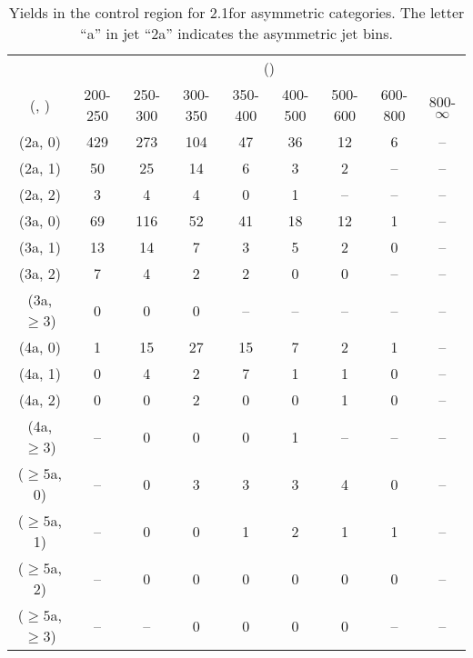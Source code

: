 \begin{table}[h!]
\tiny
\centering
\caption{Yields in the \mmj control region for 2.1\ifb for asymmetric categories. The letter ``a'' in jet \eg ``2a''  indicates the asymmetric jet bins.\label{tab:yieldssep_mumu_data_asym}}
\begin{tabular}
{ccccccccc}
	\hline\hline
	& \multicolumn{8}{c}{\scalht (\gev)} \\ 
	 (\njet,  \nb) & 200-250 & 250-300 & 300-350 & 350-400 & 400-500 & 500-600 & 600-800 & 800-$\infty$ \\ [0.8ex] 
\hline
	(2a, 0) & 429 & 273 & 104 & 47 & 36 & 12 & 6 & -- \\[0.5ex] 
	(2a, 1) & 50 & 25 & 14 & 6 & 3 & 2 & -- & -- \\[0.5ex] 
	(2a, 2) & 3 & 4 & 4 & 0 & 1 & -- & -- & -- \\[0.5ex] 
	(3a, 0) & 69 & 116 & 52 & 41 & 18 & 12 & 1 & -- \\[0.5ex] 
	(3a, 1) & 13 & 14 & 7 & 3 & 5 & 2 & 0 & -- \\[0.5ex] 
	(3a, 2) & 7 & 4 & 2 & 2 & 0 & 0 & -- & -- \\[0.5ex] 
	(3a, $\ge3$) & 0 & 0 & 0 & -- & -- & -- & -- & -- \\[0.5ex] 
	(4a, 0) & 1 & 15 & 27 & 15 & 7 & 2 & 1 & -- \\[0.5ex] 
	(4a, 1) & 0 & 4 & 2 & 7 & 1 & 1 & 0 & -- \\[0.5ex] 
	(4a, 2) & 0 & 0 & 2 & 0 & 0 & 1 & 0 & -- \\[0.5ex] 
	(4a, $\ge3$) & -- & 0 & 0 & 0 & 1 & -- & -- & -- \\[0.5ex] 
	($\ge5$a, 0) & -- & 0 & 3 & 3 & 3 & 4 & 0 & -- \\[0.5ex] 
	($\ge5$a, 1) & -- & 0 & 0 & 1 & 2 & 1 & 1 & -- \\[0.5ex] 
	($\ge5$a, 2) & -- & 0 & 0 & 0 & 0 & 0 & 0 & -- \\[0.5ex] 
	($\ge5$a, $\ge3$) & -- & -- & 0 & 0 & 0 & 0 & -- & -- \\[0.5ex] 
	\hline
	\hline
\end{tabular}
\end{table}
